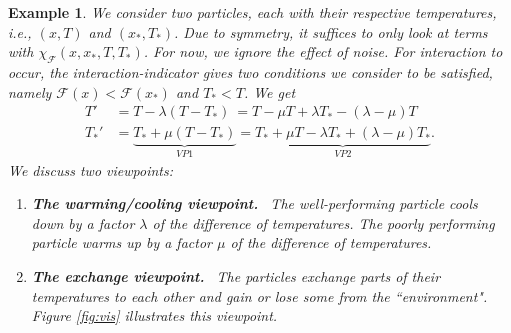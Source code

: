 \documentclass[10pt,a4paper]{article}
\theoremstyle{theorem}
\newtheorem{example}{Example}[section]
\numberwithin{equation}{section}
\begin{document}
\begin{example}
\label{ex:viewpoint}
We consider two particles, each with their respective temperatures, i.e., $(x,T)$ and $(x_*,T_*)$. Due to symmetry, it suffices to only look at terms with $\chi_\mathcal{F}(x,x_*,T,T_*)$. For now, we ignore the effect of noise. For interaction to occur, the interaction-indicator gives two conditions we consider to be satisfied, namely $\mathcal{F}(x)<\mathcal{F}(x_*)$ and $T_*<T$. We get
\begin{align*}
T' &=T-\lambda(T-T_*) \ =T-\mu T+\lambda T_* - (\lambda-\mu) T\\
T_*'&=\underbrace{T_*+\mu(T-T_*)}_{VP1}=\underbrace{T_*+\mu T -\lambda T_* +(\lambda - \mu)T_*}_{VP2}.
\end{align*}
We discuss two viewpoints:
\begin{enumerate}[leftmargin=*, align=left]
\item[$VP1$.] \textbf{The warming/cooling viewpoint.} \ The well-performing particle cools down by a factor $\lambda$ of the difference of temperatures. The poorly performing particle warms up by a factor $\mu$ of the difference of temperatures.
\item [$VP2.$]  \textbf{The exchange viewpoint.} \ The particles exchange parts of their temperatures to each other and gain or lose some from the ``environment". Figure \ref{fig:vis} illustrates this viewpoint.

\begin{figure}[htb]

\centering

\end{figure}
\end{enumerate}
\end{example}
\end{document}
